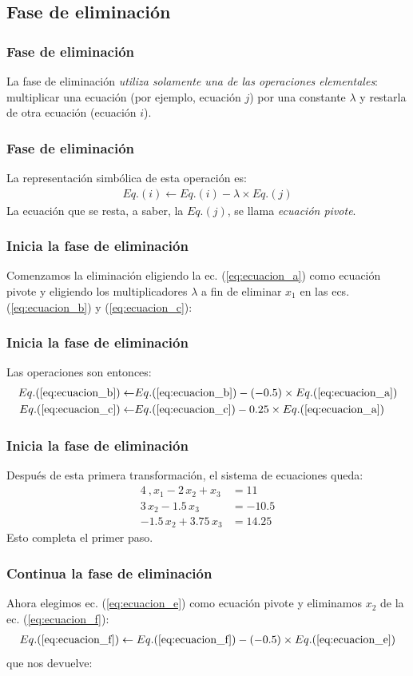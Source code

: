\subsection{Fase de eliminación}
\begin{frame}
\frametitle{Fase de eliminación}
La fase de eliminación \emph{utiliza solamente una de las operaciones elementales}: multiplicar una ecuación (por ejemplo, ecuación $j$) por una constante $\lambda$ y restarla de otra ecuación (ecuación $i$).
\end{frame}
\begin{frame}
\frametitle{Fase de eliminación}
La representación simbólica de esta operación es:
\begin{align*}
Eq.(i) \leftarrow Eq.(i) - \lambda \times Eq.(j) 
\end{align*}
La ecuación que se resta, a saber, la $Eq.(j)$, se llama \emph{ecuación pivote}.
\end{frame}
\begin{frame}
\frametitle{Inicia la fase de eliminación}
Comenzamos la eliminación eligiendo la ec. (\ref{eq:ecuacion_a}) como ecuación pivote y eligiendo los multiplicadores $\lambda$ a fin de eliminar $x_{1}$ en las ecs. (\ref{eq:ecuacion_b}) y (\ref{eq:ecuacion_c}):
\end{frame}
\begin{frame}
\frametitle{Inicia la fase de eliminación}
Las operaciones son entonces:
\begin{align*}
Eq.(\ref{eq:ecuacion_b}) \leftarrow& Eq.(\ref{eq:ecuacion_b}) - (-0.5) \times Eq.(\ref{eq:ecuacion_a}) \\
Eq.(\ref{eq:ecuacion_c}) \leftarrow& Eq.(\ref{eq:ecuacion_c}) - 0.25 \times Eq.(\ref{eq:ecuacion_a})
\end{align*}
\end{frame}
\begin{frame}
\frametitle{Inicia la fase de eliminación}
Después de esta primera transformación, el sistema de ecuaciones queda:
\begin{align}
4 \ , x_{1} - 2 \, x_{2} + x_{3} &= 11 \label{eq:ecuacion_d} \\
3 \, x_{2} - 1.5 \, x_{3} &= -10.5 \label{eq:ecuacion_e} \\
-1.5 \, x_{2} + 3.75 \, x_{3} &= 14.25 \label{eq:ecuacion_f}
\end{align}
Esto completa el primer paso.
\end{frame}
\begin{frame}
\frametitle{Continua la fase de eliminación}
Ahora elegimos ec. (\ref{eq:ecuacion_e}) como ecuación pivote y eliminamos $x_{2}$ de la ec. (\ref{eq:ecuacion_f}):
\begin{align*}
Eq.(\ref{eq:ecuacion_f}) \leftarrow Eq.(\ref{eq:ecuacion_f}) - (-0.5) \times Eq.(\ref{eq:ecuacion_e})
\end{align*}
que nos devuelve:
\end{frame}
